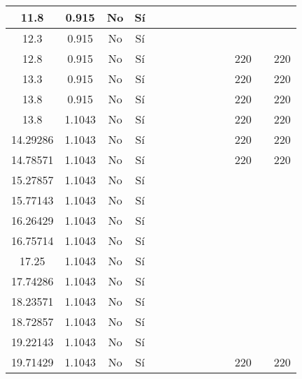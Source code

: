 \begin{table}[H]
{\begin{tabular}{|c|c|c|c|c|c|c|c|c|c|c|c|c|c|}
\hline
11.8 & 0.915 & No  & Sí  &     &     &     &     &     &     &     &     &     &  \bigstrut\\
\hline
12.3 & 0.915 & No  & Sí  &     &     &     &     &     &     &     &     &     &  \bigstrut\\
\hline
12.8 & 0.915 & No  & Sí  &     &     &     &     &     &     &     & 220 &     & 220 \bigstrut\\
\hline
13.3 & 0.915 & No  & Sí  &     &     &     &     &     &     &     & 220 &     & 220 \bigstrut\\
\hline
13.8 & 0.915 & No  & Sí  &     &     &     &     &     &     &     & 220 &     & 220 \bigstrut\\
\hline
13.8 & 1.1043 & No  & Sí  &     &     &     &     &     &     &     & 220 &     & 220 \bigstrut\\
\hline
14.29286 & 1.1043 & No  & Sí  &     &     &     &     &     &     &     & 220 &     & 220 \bigstrut\\
\hline
14.78571 & 1.1043 & No  & Sí  &     &     &     &     &     &     &     & 220 &     & 220 \bigstrut\\
\hline
15.27857 & 1.1043 & No  & Sí  &     &     &     &     &     &     &     &     &     &  \bigstrut\\
\hline
15.77143 & 1.1043 & No  & Sí  &     &     &     &     &     &     &     &     &     &  \bigstrut\\
\hline
16.26429 & 1.1043 & No  & Sí  &     &     &     &     &     &     &     &     &     &  \bigstrut\\
\hline
16.75714 & 1.1043 & No  & Sí  &     &     &     &     &     &     &     &     &     &  \bigstrut\\
\hline
17.25 & 1.1043 & No  & Sí  &     &     &     &     &     &     &     &     &     &  \bigstrut\\
\hline
17.74286 & 1.1043 & No  & Sí  &     &     &     &     &     &     &     &     &     &  \bigstrut\\
\hline
18.23571 & 1.1043 & No  & Sí  &     &     &     &     &     &     &     &     &     &  \bigstrut\\
\hline
18.72857 & 1.1043 & No  & Sí  &     &     &     &     &     &     &     &     &     &  \bigstrut\\
\hline
19.22143 & 1.1043 & No  & Sí  &     &     &     &     &     &     &     &     &     &  \bigstrut\\
\hline
19.71429 & 1.1043 & No  & Sí  &     &     &     &     &     &     &     & 220 &     & 220 \bigstrut\\

\end{tabular}}
\end{table}
